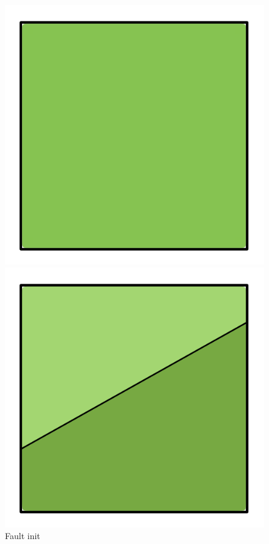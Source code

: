 \documentclass[11pt,a4paper,twoside,openright]{report}
\begin{document}
\begin{figure}[!htb]
  \includegraphics[width=\linewidth]{fault0.png}
  \caption{Fault init}\label{fig:fault0}
\endminipage\hfill
{}
  \includegraphics[width=\linewidth]{fault2.png}

\end{figure}
\end{document}
